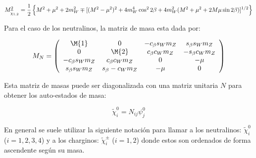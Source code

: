 \begin{equation}
  M^2_{\widetilde{\chi}_{1,2}} = \frac{1}{2} \left\{ M^2 + \mu^2 + 2 m_W^2 \mp
  [(M^2-\mu^2)^2 + 4 m_W^4 \cos^2 2\beta + 4 m_W^2 (M^2+\mu^2 + 2 M \mu \sin
    2\beta)]^{1/2} \right\}
\end{equation}



Para el caso de los neutralinos, la matriz de masa esta dada por:

\begin{equation}
  M_{N} = \left(
  \begin{array}{cccc}
    \M{1} & 0 & -c_\beta s_W m_Z & s_\beta s_W m_Z \\ 0 & \M{2} & c_\beta c_W
    m_Z & -s_\beta c_W m_Z \\

    -c_\beta s_W m_Z & c_\beta c_W m_Z & 0 & -\mu \\ s_\beta s_W m_Z & s_\beta
    -c_W m_Z & -\mu & 0 \\
  \end{array}
  \right)
\end{equation}

Esta matriz de masas puede ser diagonalizada con una matriz unitaria $N$ para
obtener los auto-estados de masa:

\begin{equation}
  \tilde{\chi}^0_i = N_{ij} \psi^0_j
\end{equation}

En general se suele utilizar la siguiente notación para llamar a los
neutralinos: $\tilde{\chi}^0_{i}$ ($i=1,2,3,4$) y a los charginos: $\tilde{\chi}^{\pm}_{i}$
($i=1,2$) donde estos son ordenados de forma ascendente según su masa.



